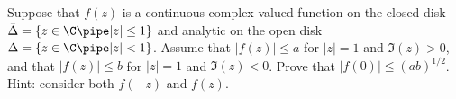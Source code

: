 Suppose that $f(z)$ is a continuous complex-valued function on the
closed disk $\bar{\Delta}=\{z\in \C \pipe |z|\leq 1\}$ and analytic on
the open disk $\Delta=\{z\in \C \pipe |z|<1\}$. Assume that
$|f(z)|\leq a$ for $|z|=1$ and $\Im(z)>0$, and that $|f(z)|\leq b$ for
$|z|=1$ and $\Im(z)<0$. Prove that $|f(0)|\leq (ab)^{1/2}$. Hint:
consider both $f(-z)$ and $f(z)$.

